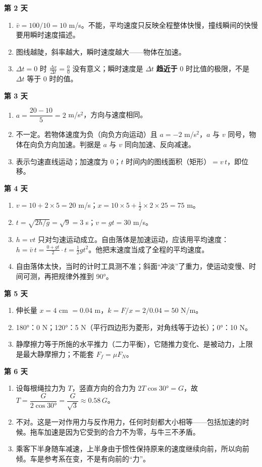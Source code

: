 \documentclass[UTF8,a4paper,11pt]{ctexart}
\begin{document}
\textbf{第 2 天}
\begin{enumerate}
  \item $\bar{v} = 100/10 = 10$ m/s。不能，平均速度只反映全程整体快慢，撞线瞬间的快慢要用瞬时速度描述。
  \item 图线越陡，斜率越大，瞬时速度越大——物体在加速。
  \item $\Delta t = 0$ 时 $\frac{\Delta x}{\Delta t} = \frac{0}{0}$ 没有意义；瞬时速度是 $\Delta t$ \textbf{趋近于} 0 时比值的极限，不是 $\Delta t$ 等于 0 时的值。
\end{enumerate}

\textbf{第 3 天}
\begin{enumerate}
  \item $a = \dfrac{20-10}{5} = 2$ m/s$^2$，方向与速度相同。
  \item 不一定。若物体速度为负（向负方向运动）且 $a = -2$ m/s$^2$，$a$ 与 $v$ 同号，物体在向负方向加速。判据是 $a$ 与 $v$ 同向加速、反向减速。
  \item 表示匀速直线运动；加速度为 0；$t$ 时间内的图线面积（矩形）$= v\,t$，即位移。
\end{enumerate}

\textbf{第 4 天}
\begin{enumerate}
  \item $v = 10 + 2\times5 = 20$ m/s；$x = 10\times5 + \frac{1}{2}\times2\times25 = 75$ m。
  \item $t = \sqrt{2h/g} = \sqrt{9} = 3$ s；$v = gt = 30$ m/s。
  \item $h = vt$ 只对匀速运动成立。自由落体是加速运动，应该用平均速度：$h = \bar{v}\,t = \frac{0+gt}{2}\cdot t = \frac{1}{2}gt^2$。他把末速度当成了全程的平均速度。
  \item 自由落体太快，当时的计时工具测不准；斜面“冲淡”了重力，使运动变慢、时间可测，再把规律外推到 90°。
\end{enumerate}

\textbf{第 5 天}
\begin{enumerate}
  \item 伸长量 $x = 4$ cm $= 0.04$ m，$k = F/x = 2/0.04 = 50$ N/m。
  \item 180°：0 N；120°：5 N（平行四边形为菱形，对角线等于边长）；0°：10 N。
  \item 静摩擦力等于所施的水平推力（二力平衡），它随推力变化、是被动力，上限是最大静摩擦力；不能套 $F_f=\mu F_N$。
\end{enumerate}

\textbf{第 6 天}
\begin{enumerate}
  \item 设每根绳拉力为 $T$，竖直方向的合力为 $2T\cos30° = G$，故 $T = \dfrac{G}{2\cos30°} = \dfrac{G}{\sqrt{3}} \approx 0.58\,G$。
  \item 不对。这是一对作用力与反作用力，任何时刻都大小相等——包括加速的时候。拖车加速是因为它受到的合力不为零，与牛三不矛盾。
  \item 乘客下半身随车减速，上半身由于惯性保持原来的速度继续向前，所以向前倾。车是参考系在变，不是有向前的“力”。
\end{enumerate}
\end{document}
